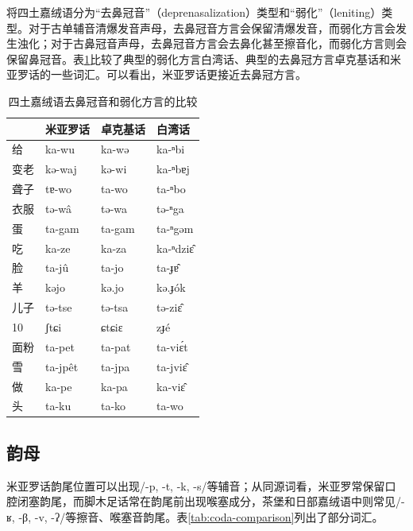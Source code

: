 \textcite{Gong2018-aw}将四土嘉绒语分为“去鼻冠音”（deprenasalization）类型和“弱化”（leniting）类型。对于古单辅音清爆发音声母，去鼻冠音方言会保留清爆发音，而弱化方言会发生浊化；对于古鼻冠音声母，去鼻冠音方言会去鼻化甚至擦音化，而弱化方言则会保留鼻冠音。表\ref{deprelen}比较了典型的弱化方言白湾话、典型的去鼻冠方言卓克基话和米亚罗话的一些词汇。可以看出，米亚罗话更接近去鼻冠方言。

\begin{table}[H]
\vspace{5pt}
    \centering
    \caption{四土嘉绒语去鼻冠音和弱化方言的比较}
    \label{deprelen}
\begin{tabular}{l|lll}
\toprule
          & 米亚罗话     & 卓克基话   & 白湾话       \\
\midrule
给   & ka-wu    & ka-wə  & ka-ⁿbi    \\
变老 & kə-waj   & kə-wi  & ka-ⁿbɐj   \\
聋子      & tɐ-wo    & ta-wo  & ta-ⁿbo    \\
衣服     & tə-wâ   & tə-wa  & tə-ⁿga    \\
蛋       & ta-gam   & ta-gam & ta-ⁿgəm   \\
吃    & ka-ze    & ka-za  & ka-ⁿdziɛ̂ \\
脸      & ta-jû   & ta-jo  & ta-ɟɐ̂    \\
羊     & kəjo     & kə.jo  & kə.ɟók    \\
儿子       & tə-tse   & tə-tsa & tə-ziɛ̂   \\
10       & ʃtɕi     & ɕtɕiɛ  & zɟé       \\
面粉     & ta-pet   & ta-pat & ta-viɛ́t  \\
雪      & ta-jpêt & ta-jpa & ta-jviɛ̂  \\
做    & ka-pe    & ka-pa  & ka-viɛ̂   \\
头      & ta-ku    & ta-ko  & ta-wo    \\
\bottomrule
\end{tabular}
\end{table}

\subsection{韵母}

米亚罗话韵尾位置可以出现/-p, -t, -k, -s/等辅音；从同源词看，米亚罗常保留口腔闭塞韵尾，而脚木足话常在韵尾前出现喉塞成分，茶堡和日部嘉绒语中则常见/-ʁ, -β, -v, -ʔ/等擦音、喉塞音韵尾。表\ref{tab:coda-comparison}列出了部分词汇。

